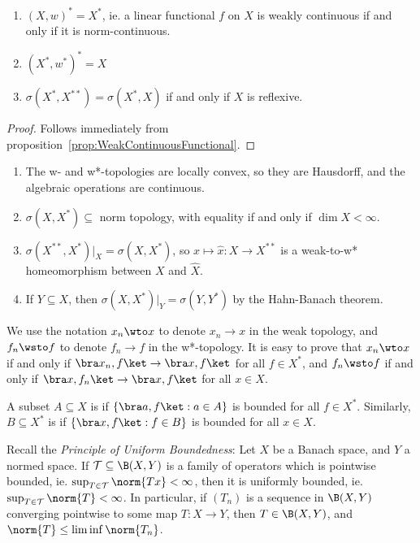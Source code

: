 \documentclass[a4paper]{article}
\begin{document}
\begin{nprop}\label{prop:WeakTopologyFunctional}
	\begin{enumerate}[label=(\roman*)]
		\item $(X,w)^*=X^*$, ie. a linear functional $f$ on $X$ is weakly continuous if and only if it is norm-continuous.
		\item $(X^*,w^*)^*=X$
		\item $\sigma(X^*,X^{**})=\sigma(X^*,X)$ if and only if $X$ is reflexive.
	\end{enumerate}
\end{nprop}

\begin{proof}
  Follows immediately from proposition~\ref{prop:WeakContinuousFunctional}.
\end{proof}

\begin{remark}
	\begin{enumerate}[label=(\arabic*)]
		\item The w- and w*-topologies are locally convex, so they are Hausdorff, and the algebraic operations are continuous.
		\item $\sigma(X,X^*)\subseteq$ norm topology, with equality if and only if $\dim X<\infty$.
		\item $\sigma(X^{**},X^*)|_X=\sigma(X,X^*)$, so $x\mapsto\hat{x}:X\to X^{**}$ is a weak-to-w* homeomorphism between $X$ and $\widehat{X}$.
		\item If $Y\subseteq X$, then $\sigma(X,X^*)|_Y=\sigma(Y,Y^*)$ by the Hahn-Banach theorem.
	\end{enumerate}
\end{remark}

We use the notation $x_n\wto x$ to denote $x_n\to x$ in the weak topology, and $f_n\wsto f$ to denote $f_n\to f$ in the w*-topology. It is easy to prove that $x_n\wto x$ if and only if $\bra x_n,f\ket\to\bra x,f\ket$ for all $f\in X^*$, and $f_n\wsto f$ if and only if $\bra x,f_n\ket\to\bra x,f\ket$ for all $x\in X$.

A subset $A\subseteq X$ is  if $\{\bra a,f\ket:a\in A\}$ is bounded for all $f\in X^*$. Similarly, $B\subseteq X^*$ is  if $\{\bra x,f\ket:f\in B\}$ is bounded for all $x\in X$.

Recall the \emph{Principle of Uniform Boundedness}: Let $X$ be a Banach space, and $Y$ a normed space. If $\mathcal{T}\subseteq\B(X,Y)$ is a family of operators which is pointwise bounded, ie. $\sup_{T\in\mathcal{T}}\norm{Tx}<\infty$, then it is uniformly bounded, ie. $\sup_{T\in\mathcal{T}}\norm{T}<\infty$. In particular, if $(T_n)$ is a sequence in $\B(X,Y)$ converging pointwise to some map $T:X\to Y$, then $T\in\B(X,Y)$, and $\norm{T}\leq\liminf\norm{T_n}$.
\end{document}

